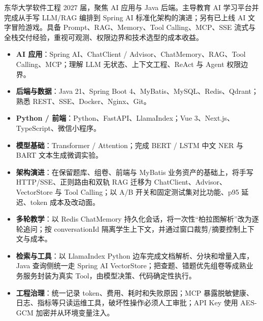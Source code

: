 东华大学软件工程 2027 届，聚焦 AI 应用与 Java 后端。主导教育 AI 学习平台并完成从手写 LLM/RAG 编排到 Spring AI 标准化架构的演进；另有已上线 AI 文字冒险游戏。具备 Prompt、RAG、Memory、Tool Calling、MCP、SSE 流式与全栈交付经验，重视可观测、权限边界和技术选型的成本收益。

\begin{itemize}[parsep=0.35ex]
  \item \textbf{AI 应用}：Spring AI、ChatClient / Advisor、ChatMemory、RAG、Tool Calling、MCP；理解 LLM 无状态、上下文工程、ReAct 与 Agent 权限边界。
  \item \textbf{后端与数据}：Java 21、Spring Boot 4、MyBatis、MySQL、Redis、Qdrant；熟悉 REST、SSE、Docker、Nginx、Git。
  \item \textbf{Python / 前端}：Python、FastAPI、LlamaIndex；Vue 3、Next.js、TypeScript、微信小程序。
  \item \textbf{模型基础}：Transformer / Attention；完成 BERT / LSTM 中文 NER 与 BART 文本生成微调实验。
\end{itemize}


\begin{itemize}
  \item \textbf{架构演进}：在保留题库、组卷、前端与 MyBatis 业务资产的基础上，将手写 HTTP/SSE、正则路由和双轨 RAG 迁移为 ChatClient、Advisor、VectorStore 与 Tool Calling；以 A/B 开关和固定测试集对比功能、p95 延迟、token 成本及改动面。
  \item \textbf{多轮教学}：以 Redis ChatMemory 持久化会话，将一次性“柏拉图解析”改为逐轮追问；按 conversationId 隔离学生上下文，并通过窗口裁剪/摘要控制上下文与成本。
  \item \textbf{检索与工具}：以 LlamaIndex Python 边车完成文档解析、分块和增量入库，Java 查询侧统一走 Spring AI VectorStore；把查题、错题优先组卷等成熟业务服务封装为真实 Tool，由模型决策、代码确定性执行。
  \item \textbf{工程治理}：统一记录 token、费用、耗时和失败原因；MCP 暴露脱敏健康、日志、指标等只读运维工具，破坏性操作必须人工审批；API Key 使用 AES-GCM 加密并从环境变量注入。
\end{itemize}

